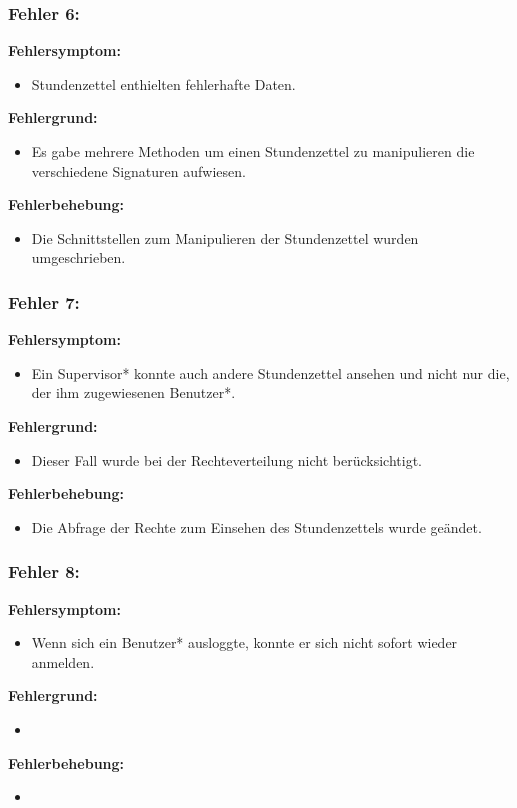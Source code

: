 \subsubsection{Fehler 6:} %
\textbf{Fehlersymptom:}
	\begin{itemize}
		\item Stundenzettel enthielten fehlerhafte Daten.
	\end{itemize}
\textbf{Fehlergrund:}
	\begin{itemize}
		\item Es gabe mehrere Methoden um einen Stundenzettel zu manipulieren die verschiedene Signaturen aufwiesen.
	\end{itemize}
\textbf{Fehlerbehebung:}
	\begin{itemize}
		\item Die Schnittstellen zum Manipulieren der Stundenzettel wurden umgeschrieben.
	\end{itemize}

\subsubsection{Fehler 7:} %
\textbf{Fehlersymptom:}
	\begin{itemize}
		\item Ein Supervisor* konnte auch andere Stundenzettel ansehen und nicht nur die, der ihm zugewiesenen Benutzer*.
	\end{itemize}
\textbf{Fehlergrund:}
	\begin{itemize}
		\item Dieser Fall wurde bei der Rechteverteilung nicht berücksichtigt.
	\end{itemize}
\textbf{Fehlerbehebung:}
	\begin{itemize}
		\item Die Abfrage der Rechte zum Einsehen des Stundenzettels wurde geändet.
	\end{itemize}

\subsubsection{Fehler 8:} %
\textbf{Fehlersymptom:}
	\begin{itemize}
		\item Wenn sich ein Benutzer* ausloggte, konnte er sich nicht sofort wieder anmelden.
	\end{itemize}
\textbf{Fehlergrund:}
	\begin{itemize}
		\item 
	\end{itemize}
\textbf{Fehlerbehebung:}
	\begin{itemize}
		\item 
	\end{itemize}
	
